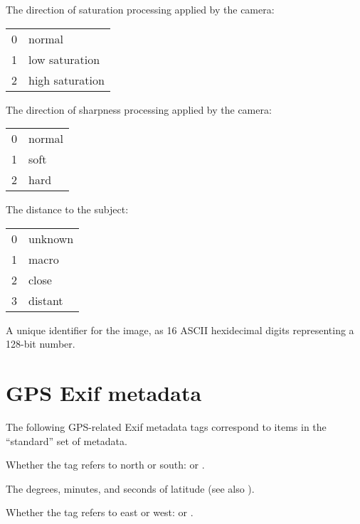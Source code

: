 The direction of saturation processing applied by the camera:
\smallskip

\begin{tabular}{p{0.3in} p{4in}}
0 & normal \\
1 & low saturation \\
2 & high saturation
\end{tabular}
\apiend

The direction of sharpness processing applied by the camera:
\smallskip

\begin{tabular}{p{0.3in} p{4in}}
0 & normal \\
1 & soft \\
2 & hard
\end{tabular}
\apiend


The distance to the subject:
\smallskip

\begin{tabular}{p{0.3in} p{4in}}
0 & unknown \\
1 & macro \\
2 & close \\
3 & distant
\end{tabular}
\apiend

A unique identifier for the image, as 16 ASCII hexidecimal digits 
representing a 128-bit number.
\apiend


\section{GPS Exif metadata}
\label{sec:metadata:GPS}

The following GPS-related Exif metadata tags correspond to items in the
``standard'' set of metadata.


Whether the  tag refers to north or south:  or 
.
\apiend

The degrees, minutes, and seconds of latitude (see also ).
\apiend

Whether the  tag refers to east or west:  or 
.
\apiend

